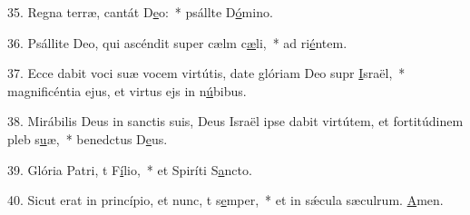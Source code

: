 35. Regna terræ, cantát D\uline{e}o:~* psállte D\uline{ó}mino.\par 
36. Psállite Deo, qui ascéndit super cælm c\uline{æ}li,~* ad ri\uline{é}ntem.\par 
37. Ecce dabit voci suæ vocem virtútis, date glóriam Deo supr \uline{I}sraël,~* magnificéntia ejus, et virtus ejs in n\uline{ú}bibus.\par 
38. Mirábilis Deus in sanctis suis, Deus Israël ipse dabit virtútem, et fortitúdinem pleb s\uline{u}æ,~* benedctus D\uline{e}us.\par 
39. Glória Patri, t F\uline{í}lio,~* et Spiríti S\uline{a}ncto.\par 
40. Sicut erat in princípio, et nunc, t s\uline{e}mper,~* et in sǽcula sæculrum. \uline{A}men.\par 
